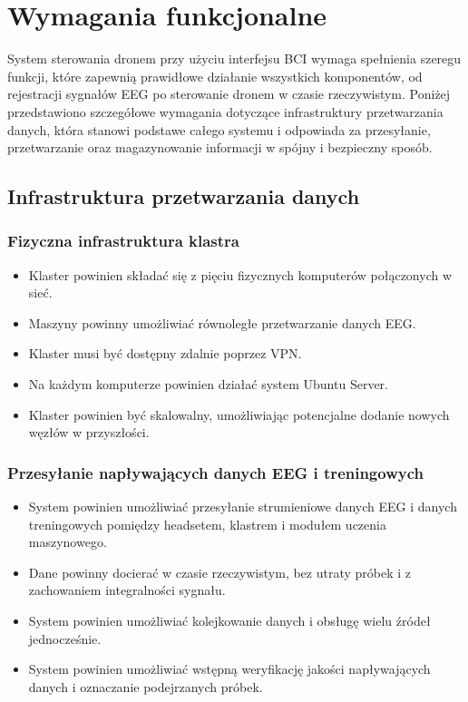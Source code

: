 \newpage
\section{Wymagania funkcjonalne}

System sterowania dronem przy użyciu interfejsu BCI wymaga spełnienia szeregu funkcji, które zapewnią prawidłowe działanie wszystkich komponentów, od rejestracji sygnałów EEG po sterowanie dronem w czasie rzeczywistym. Poniżej przedstawiono szczegółowe wymagania dotyczące infrastruktury przetwarzania danych, która stanowi podstawe całego systemu i odpowiada za przesyłanie, przetwarzanie oraz magazynowanie informacji w spójny i bezpieczny sposób.

\subsection{Infrastruktura przetwarzania danych}

\subsubsection{Fizyczna infrastruktura klastra}
\begin{itemize}
    \item Klaster powinien składać się z pięciu fizycznych komputerów połączonych w sieć.
    \item Maszyny powinny umożliwiać równoległe przetwarzanie danych EEG.
    \item Klaster musi być dostępny zdalnie poprzez VPN.
    \item Na każdym komputerze powinien działać system Ubuntu Server.
    \item Klaster powinien być skalowalny, umożliwiając potencjalne dodanie nowych węzłów w przyszłości.
\end{itemize}
\subsubsection{Przesyłanie napływających danych EEG i treningowych}
\begin{itemize}
    \item System powinien umożliwiać przesyłanie strumieniowe danych EEG i danych treningowych pomiędzy headsetem, klastrem i modułem uczenia maszynowego.
    \item Dane powinny docierać w czasie rzeczywistym, bez utraty próbek i z zachowaniem integralności sygnału.
    \item System powinien umożliwiać kolejkowanie danych i obsługę wielu źródeł jednocześnie.
    \item System powinien umożliwiać wstępną weryfikację jakości napływających danych i oznaczanie podejrzanych próbek.
\end{itemize}
